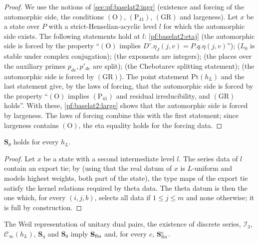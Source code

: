\begin{proof}
We use the notions of \cref{sec:pf:baselat2:ingr} (existence and forcing of the automorphic side, the
conditions $(\mathrm{O})$, $(\mathrm{P}_{41})$, $(\mathrm{GR})$ and largeness). Let $x$ be a state over $P$ with a
strict-Henselian-acyclic level $l$ for which the automorphic side exists. The following statements hold at
$l$: \cref{pf:baselat2:etaj} (the automorphic side is forced by the property ``$(\mathrm{O})$ implies
$D'.\eta_J(j,v)=P.q.\eta(j,v)$'');
 ($L_0$ is stable under complex conjugation);
 (the exponents are integers);
 (the places over the auxiliary primes
$p_{de},p'_{de}$ are split);
 (the Chebotarev splitting statement);
 (the automorphic side is forced by
$(\mathrm{GR})$). The point statement $\mathrm{Pt}(h_L)$ and the last statement give, by the laws of forcing, that
the automorphic side is forced by the property ``$(\mathrm{O})$ implies $(\mathrm{P}_{41})$ and residual
irreducibility, and $(\mathrm{GR})$ holds''. With these, \cref{pf:baselat2:large} shows that the automorphic side
is forced by largeness. The laws of forcing combine this with the first statement; since largeness contains
$(\mathrm{O})$, the eta equality holds for the forcing data.
\end{proof}

\begin{lemma}\label{pf:baselat2:sxd}
$\mathbf{S}_{\theta}$ holds for every $h_L$.
\end{lemma}

\begin{proof}
Let $x$ be a state with a second intermediate level $l$. The series data of $l$ contain an export tie;
by  (using that the real datum of $x$ is $L$-uniform
and models highest weights, both part of the state), the type maps of the export tie satisfy the kernel
relations required by theta data. The theta datum is then the one which, for every $(i,j,b)$, selects
all data if $1\le j\le m$ and none otherwise; it is full by construction.
\end{proof}

\begin{proposition}\label{pf:baselat2:fin}
The Weil representation of unitary dual pairs, the existence of discrete series, $\mathcal{I}_3$,
$\mathcal{C}_{\infty}(h_L)$, $\mathbf{S}_{\eta}$ and $\mathbf{S}_{\theta}$ imply $\mathbf{S}_{\mathrm{fin}}$ and, for every
$c$, $\mathbf{S}_{\mathrm{fin}}^{c}$.
\end{proposition}

